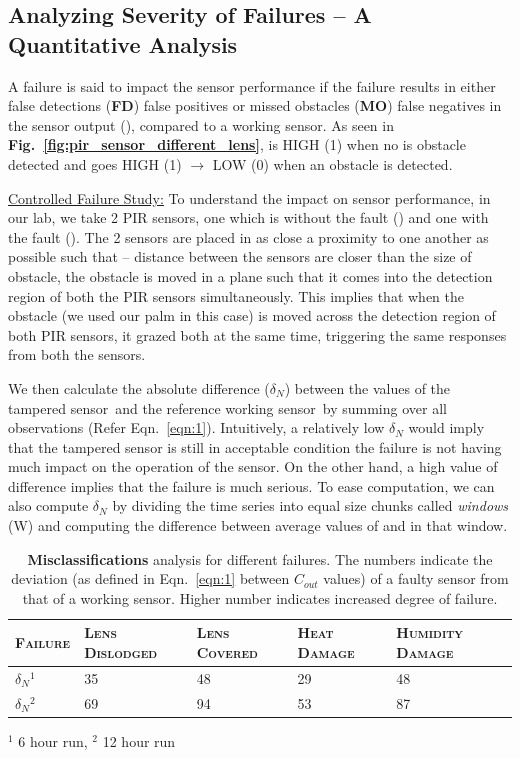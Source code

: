 \subsection{Analyzing Severity of Failures -- A Quantitative Analysis}
\label{subsec:quantify}
A failure is said to impact the sensor performance if the failure results in either false detections ({\bfseries FD}) \ie false positives or missed obstacles ({\bfseries MO}) \ie false negatives in the sensor output (\cout), compared to a working sensor. As seen in {\bfseries Fig.~\ref{fig:pir_sensor_different_lens}}, \cout is HIGH (1) when no is obstacle detected and \cout goes HIGH (1) $\rightarrow$ LOW (0) when an obstacle is detected.


\noindent \underline{Controlled Failure Study:} To understand the impact on sensor performance, in our lab, we take 2 PIR sensors, one which is without the fault (\working) and one with the fault (\tampered). The 2 sensors are placed in as close a proximity to one another as possible such that -- \ca distance between the sensors are closer than the size of obstacle, \cb the obstacle is moved in a plane such that it comes into the detection region of both the PIR sensors simultaneously. This implies that when the obstacle (we used our palm in this case) is moved across the detection region of both PIR sensors, it grazed both at the same time, triggering the same responses from both the sensors.

We then calculate the absolute difference ($\delta_N$) between the \cout values of the tampered sensor~\viz  \couttampered and the reference working sensor~\viz \coutworking by summing over all observations (Refer Eqn.~\ref{eqn:1}). Intuitively, a relatively low $\delta_N$ would imply that the tampered sensor is still in acceptable condition \ie the failure is not having much impact on the operation of the sensor. On the other hand, a high value of difference implies that the failure is much serious. To ease computation, we can also compute $\delta_N$ by dividing the time series into equal size chunks called \textit{windows} (W) and computing the difference between average \cout values of \tampered and \working in that window.

\begin{table}%
	\small
	\centering
	\caption{\textbf{Misclassifications} analysis for different failures. The numbers indicate the deviation (as defined in Eqn.~\ref{eqn:1} between $C_{out}$ values) of a faulty sensor from that of a working sensor. Higher number indicates increased degree of failure.}
	\begin{tabular}{lllll}
		\hline
		\bfseries \textsc{Failure} & \bfseries \textsc{Lens Dislodged} & \bfseries \textsc{Lens Covered} & \bfseries \textsc{Heat Damage} & \bfseries \textsc{Humidity Damage}\\
		\hline \hline
		\rowcolor{gray!20} $\delta_N$$^1$ & 35 & 48 & 29 & 48 \\
		$\delta_N$$^2$ & 69 & 94  & 53 & 87 \\
		\hline 
	\end{tabular}
	\label{tbl:fault_degree}
	\quad \raggedright
	$^1$ 6 hour run, $^2$ 12 hour run
\end{table} 

